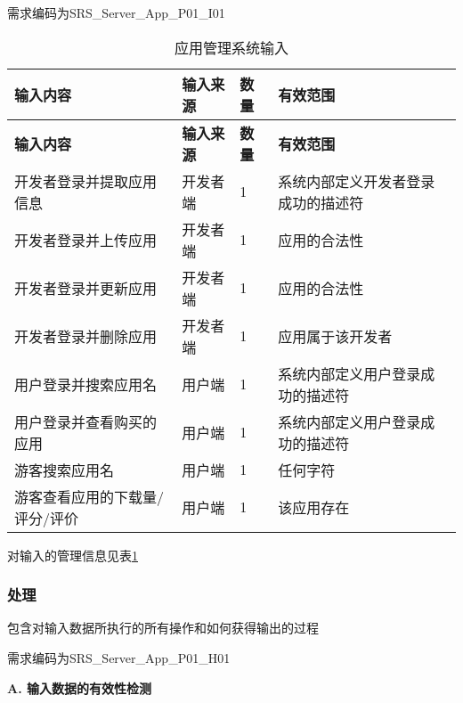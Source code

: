需求编码为SRS\_Server\_App\_P01\_I01

\begin{longtable}{|p{3cm}|p{4cm}|p{1cm}|p{6cm}|}
\caption{应用管理系统输入}\label{tab:concrete_app_sys_input} \\
\hline
\textbf{输入内容} & \textbf{输入来源} & \textbf{数量}  & \textbf{有效范围}    \\
\hline
\endfirsthead
\hline
\textbf{输入内容} & \textbf{输入来源} & \textbf{数量}  & \textbf{有效范围}  \\
\hline
\endhead
\hline 
\endfoot
\hline
\endlastfoot

开发者登录并提取应用信息 & 开发者端 & 1 & 系统内部定义开发者登录成功的描述符 \\
开发者登录并上传应用 & 开发者端 & 1 & 应用的合法性 \\
开发者登录并更新应用 & 开发者端 & 1 & 应用的合法性 \\
开发者登录并删除应用 & 开发者端 & 1 & 应用属于该开发者 \\
用户登录并搜索应用名 & 用户端 & 1 & 系统内部定义用户登录成功的描述符 \\
用户登录并查看购买的应用 & 用户端 & 1 & 系统内部定义用户登录成功的描述符 \\
游客搜索应用名 & 用户端 & 1 & 任何字符 \\
游客查看应用的下载量/评分/评价 & 用户端 &1 & 该应用存在 \\

\end{longtable}


对输入的管理信息见表\ref{tab:concrete_app_sys_input}	

\subsubsection{处理}
包含对输入数据所执行的所有操作和如何获得输出的过程

需求编码为SRS\_Server\_App\_P01\_H01

\textbf{A. 输入数据的有效性检测}

